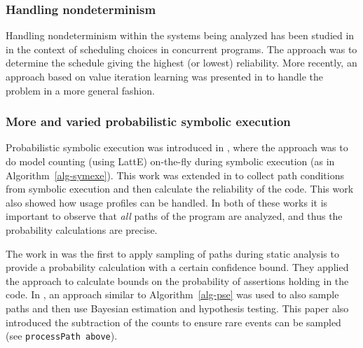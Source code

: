 
\subsubsection{Handling nondeterminism}

Handling nondeterminism within the systems being analyzed has been studied in \cite{Filieri2013} in the context of scheduling choices in concurrent programs. The approach was to determine the schedule giving the highest (or lowest) reliability. More recently, an approach based on value iteration learning was presented in \cite{luckow2014exact} to handle the problem in a more general fashion.

\subsubsection{More and varied probabilistic symbolic execution}

Probabilistic symbolic execution was introduced in \cite{Geldenhuys2012}, where the approach was to do model counting (using LattE) on-the-fly during symbolic execution (as in Algorithm~\ref{alg-symexe}). This work was extended in \cite{Filieri2013} to collect path conditions from symbolic execution and then calculate the reliability of the code. This work also showed how usage profiles can be handled. In both of these works it is important to observe that {\it all} paths of the program are analyzed, and thus the probability calculations are precise. 

The work in \cite{Sankaranarayanan2013} was the first to apply sampling of paths during static analysis to provide a probability calculation with a certain confidence bound. They applied the approach to calculate bounds on the probability of assertions holding in the code. In \cite{filieri2014statistical}, an approach similar to Algorithm~\ref{alg-pse} was used to also sample paths and then use Bayesian estimation and hypothesis testing. This paper also introduced the subtraction of the counts to ensure rare events can be sampled (see {\tt processPath above}). 


